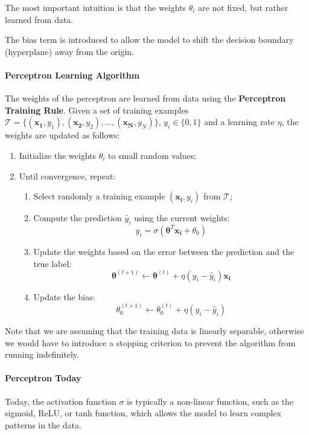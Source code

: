 The most important intuition is that the weights $\theta_i$ are not fixed, but rather learned from data. 

The bias term is introduced to allow the model to shift the decision boundary (hyperplane) away from the origin.

\paragraph{Perceptron Learning Algorithm}
\label{perceptron-training}
The weights of the perceptron are learned from data using the \textbf{Perceptron Training Rule}.
Given a set of training examples $\mathcal{T} = \{(\boldsymbol{x_1}, y_1), (\boldsymbol{x_2}, y_2), \ldots, (\boldsymbol{x_N}, y_N)\}$, $y_i \in \{0, 1\}$
and a learning rate $\eta$, the weights are updated as follows:
\begin{enumerate}
    \item Initialize the weights $\theta_i$ to small random values;
    \item Until convergence, repeat:
    \begin{enumerate}
        \item Select randomly a training example $(\boldsymbol{x_i}, y_i)$ from $\mathcal{T}$;
        \item Compute the prediction $\hat{y}_i$ using the current weights:
        \[ \hat{y}_i = \sigma\left(\boldsymbol{\theta}^T \boldsymbol{x_i} + \theta_0 \right) \]
        \item Update the weights based on the error between the prediction and the true label:
        \[ \boldsymbol{\theta}^{(t+1)} \leftarrow \boldsymbol{\theta}^{(t)} + \eta (y_i - \hat{y}_i) \boldsymbol{x_i} \]
        \item Update the bias:
        \[ \theta_0^{(t+1)} \leftarrow \theta_0^{(t)} + \eta (y_i - \hat{y}_i) \]
    \end{enumerate}
\end{enumerate}
Note that we are assuming that the training data is linearly separable, otherwise we would have to introduce a stopping criterion to prevent the algorithm from running indefinitely.

\paragraph{Perceptron Today}
Today, the activation function $\sigma$ is typically a non-linear function, such as the sigmoid, ReLU, or tanh function, 
which allows the model to learn complex patterns in the data.

